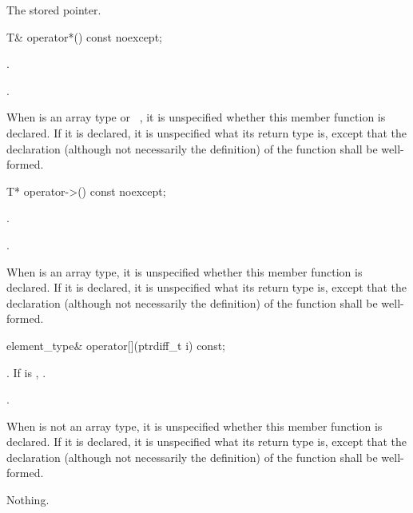\begin{itemdescr}
\pnum\returns The stored pointer.
\end{itemdescr}

%
\begin{itemdecl}
T& operator*() const noexcept;
\end{itemdecl}

\begin{itemdescr}
\pnum\requires  {}.

\pnum\returns  {}.

\pnum\remarks When  is an array type or \cv{}~,
it is unspecified whether this
member function is declared. If it is declared, it is unspecified what its
return type is, except that the declaration (although not necessarily the
definition) of the function shall be well-formed.
\end{itemdescr}

%
\begin{itemdecl}
T* operator->() const noexcept;
\end{itemdecl}

\begin{itemdescr}
\pnum\requires  {}.

\pnum\returns  {}.

\pnum\remarks When  is an array type,
it is unspecified whether this member function is declared.
If it is declared, it is unspecified what its return type is,
except that the declaration (although not necessarily the definition)
of the function shall be well-formed.
\end{itemdescr}

%
\begin{itemdecl}
element_type& operator[](ptrdiff_t i) const;
\end{itemdecl}

\begin{itemdescr}
\pnum\requires {}.
If  is , .

\pnum\returns {}.

\pnum\remarks When  is not an array type,
it is unspecified whether this member function is declared.
If it is declared, it is unspecified what its return type is,
except that the declaration (although not necessarily the definition)
of the function shall be well-formed.

\pnum\throws Nothing.
\end{itemdescr}

